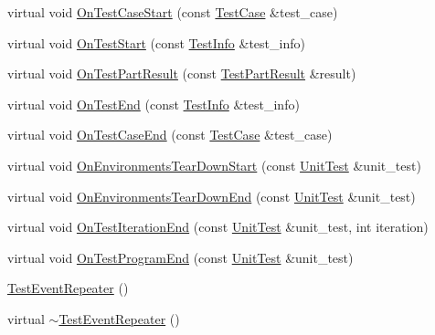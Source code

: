 \begin{DoxyCompactItemize}
\item 
virtual void \hyperlink{classtesting_1_1internal_1_1TestEventRepeater_adeff7f41a379b240b282fe511ff8bcbf}{\-On\-Test\-Case\-Start} (const \hyperlink{classtesting_1_1TestCase}{\-Test\-Case} \&test\-\_\-case)
\item 
virtual void \hyperlink{classtesting_1_1internal_1_1TestEventRepeater_ae19a0ede8525bdc3ec6e05725004769b}{\-On\-Test\-Start} (const \hyperlink{classtesting_1_1TestInfo}{\-Test\-Info} \&test\-\_\-info)
\item 
virtual void \hyperlink{classtesting_1_1internal_1_1TestEventRepeater_a2999e3c9131fe27efd468fb4c20aef3a}{\-On\-Test\-Part\-Result} (const \hyperlink{classtesting_1_1TestPartResult}{\-Test\-Part\-Result} \&result)
\item 
virtual void \hyperlink{classtesting_1_1internal_1_1TestEventRepeater_a57247960bc1147abddf11908402394c1}{\-On\-Test\-End} (const \hyperlink{classtesting_1_1TestInfo}{\-Test\-Info} \&test\-\_\-info)
\item 
virtual void \hyperlink{classtesting_1_1internal_1_1TestEventRepeater_a3cc06a6f14e5734766b458543ca2115e}{\-On\-Test\-Case\-End} (const \hyperlink{classtesting_1_1TestCase}{\-Test\-Case} \&test\-\_\-case)
\item 
virtual void \hyperlink{classtesting_1_1internal_1_1TestEventRepeater_a3dd57271e7f1c9b85e8280acc6114b03}{\-On\-Environments\-Tear\-Down\-Start} (const \hyperlink{classtesting_1_1UnitTest}{\-Unit\-Test} \&unit\-\_\-test)
\item 
virtual void \hyperlink{classtesting_1_1internal_1_1TestEventRepeater_aa4355567b2991e8e38e4fcb964f44387}{\-On\-Environments\-Tear\-Down\-End} (const \hyperlink{classtesting_1_1UnitTest}{\-Unit\-Test} \&unit\-\_\-test)
\item 
virtual void \hyperlink{classtesting_1_1internal_1_1TestEventRepeater_aa21b349a51378e47877ee6d153c37116}{\-On\-Test\-Iteration\-End} (const \hyperlink{classtesting_1_1UnitTest}{\-Unit\-Test} \&unit\-\_\-test, int iteration)
\item 
virtual void \hyperlink{classtesting_1_1internal_1_1TestEventRepeater_a01d008c30d3b3e73f55f77aabc4cbbb9}{\-On\-Test\-Program\-End} (const \hyperlink{classtesting_1_1UnitTest}{\-Unit\-Test} \&unit\-\_\-test)
\item 
\hyperlink{classtesting_1_1internal_1_1TestEventRepeater_a75cb462a1faf8e97a8ea24af5a3730c7}{\-Test\-Event\-Repeater} ()
\item 
virtual \hyperlink{classtesting_1_1internal_1_1TestEventRepeater_a41e90eafd060c8458051647f212d468f}{$\sim$\-Test\-Event\-Repeater} ()

\end{DoxyCompactItemize}
